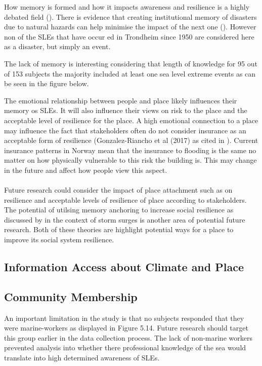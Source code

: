 How memory is formed and how it impacts awareness and resilience is a highly debated field (\cite{de_guttry_expiry_2022}). There is evidence that creating institutional memory of disasters due to natural hazards can help minimise the impact of the next one (\cite{de_guttry_expiry_2022}). However non of the SLEs that have occur ed in Trondheim since 1950 are considered here as a disaster, but simply an event.  

  The lack of memory is interesting considering that length of knowledge for 95 out of 153 subjects the majority included at least one sea level extreme events as can be seen in the figure below. 

The emotional relationship between people and place likely influences their memory os SLEs. It will also influence their views on risk to the place and the acceptable level of resilience for the place. A high emotional connection to a place may influence the fact that stakeholders often do not consider insurance as an acceptable form of resilience (Gonzalez-Riancho et al (2017) as cited in \cite{gerkensmeier_governing_2018}). Current insurance patterns in Norway mean that the insurance to flooding is the same no matter on how physically vulnerable to this risk the building is. This may change in the future and affect how people view this aspect.
\paragraph{}
Future research could consider the impact of place attachment such as \cite{ariccio_place_2021} on resilience and acceptable levels of resilience of place according to stakeholders. The potential of utilsing memory anchoring to increase social resilience as discussed by \cite{de_guttry_expiry_2022} in the context of storm surges is another area of potential future research. Both of these theories are highlight potential ways for a place to improve its social system resilience. 

\subsection{Information Access about Climate and Place}




\subsection{Community Membership}
An important limitation in the study is that no subjects responded that they were marine-workers as displayed in Figure 5.14. Future research should target this group earlier in the data collection process. The lack of non-marine workers prevented analysis into whether there professional knowledge of the sea would translate into high determined awareness of SLEs.
